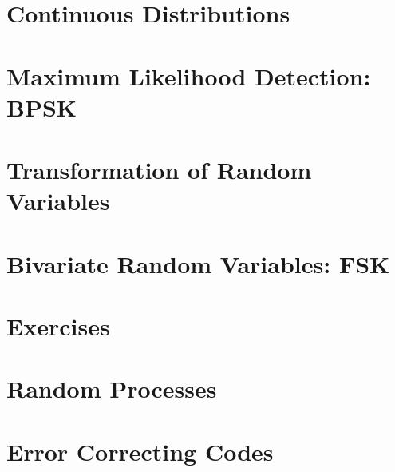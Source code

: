 \documentclass[journal]{IEEEtran}
\begin{document}
\section{Continuous Distributions}

\section{Maximum Likelihood Detection: BPSK}

\section{Transformation of Random Variables}

\section{Bivariate Random Variables: FSK}

\section{Exercises}

\section{Random Processes}

\section{Error Correcting Codes}


% 
\backmatter
\fi
\appendix

\end{document}
